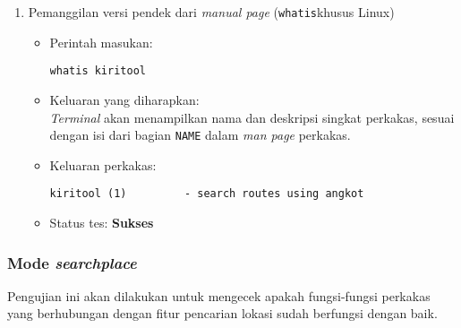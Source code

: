 \begin{enumerate}
	\item Pemanggilan versi pendek dari \textit{manual page} (\verb|whatis|\textemdash khusus Linux)
	\begin{itemize}
		\item Perintah masukan:
		\begin{lstlisting}
whatis kiritool
		\end{lstlisting}
		\item Keluaran yang diharapkan: \\
		\textit{Terminal} akan menampilkan nama dan deskripsi singkat perkakas, sesuai dengan isi dari bagian \verb|NAME| dalam \textit{man page} perkakas.
		\item Keluaran perkakas:
		\begin{lstlisting}
kiritool (1)         - search routes using angkot
		\end{lstlisting}
		\item Status tes: \textbf{Sukses}
	\end{itemize}

\end{enumerate}

\subsubsection{Mode \textit{searchplace}}
\label{sec:testing-experiments-testing-searchplace}

Pengujian ini akan dilakukan untuk mengecek apakah fungsi-fungsi perkakas yang berhubungan dengan fitur pencarian lokasi sudah berfungsi dengan baik.

